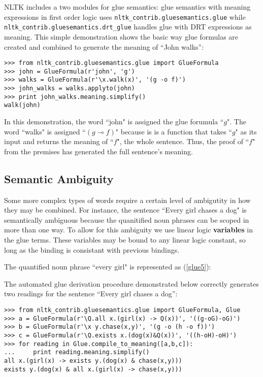 \documentclass{article}
\newcommand{\dhgcode}[1]{{\tt #1}}
\begin{document}

NLTK includes a two modules for glue semantics: glue semantics with meaning expressions in first order logic uses \dhgcode{nltk\_contrib.gluesemantics.glue} while \dhgcode{nltk\_contrib.gluesemantics.drt\_glue} handles glue with DRT expressions as meaning.  This simple demonstration shows the basic way glue formulas are created and combined to generate the meaning of ``John walks'':

\begin{verbatim}
>>> from nltk_contrib.gluesemantics.glue import GlueFormula
>>> john = GlueFormula(r'john', 'g')
>>> walks = GlueFormula(r'\x.walk(x)', '(g -o f)')
>>> john_walks = walks.applyto(john)
>>> print john_walks.meaning.simplify()
walk(john)
\end{verbatim}

In this demonstration, the word ``john" is assigned the glue forumula ``$g$".  The word ``walks" is assigned ``$(g \multimap f)$" because is is a function that takes ``$g$" as its input and returns the meaning of ``$f$", the whole sentence.  Thus, the proof of ``$f$" from the premises has generated the full sentence's meaning.

\subsection{Semantic Ambiguity}

Some more complex types of words require a certain level of ambigutity in how they may be combined.  For instance, the sentence ``Every girl chases a dog" is semantically ambiguous because the quanitified noun phrases can be scoped in more than one way.  To allow for this ambiguity we use linear logic \textbf{variables} in the glue terms.  These variables may be bound to any linear logic constant, so long as the binding is consistant with previous bindings.

The quantified noun phrase ``every girl" is represented as (\ref{glue5}):



The automated glue derivation procedure demonstrated below correctly generates two readings for the sentence ``Every girl chases a dog'':

\begin{verbatim}
>>> from nltk_contrib.gluesemantics.glue import GlueFormula, Glue
>>> a = GlueFormula(r'\Q.all x.(girl(x) -> Q(x))', '((g-oG)-oG)')
>>> b = GlueFormula(r'\x y.chase(x,y)', '(g -o (h -o f))')
>>> c = GlueFormula(r'\Q.exists x.(dog(x)&Q(x))', '((h-oH)-oH)')
>>> for reading in Glue.compile_to_meaning([a,b,c]):
...     print reading.meaning.simplify()
all x.(girl(x) -> exists y.(dog(x) & chase(x,y)))
exists y.(dog(x) & all x.(girl(x) -> chase(x,y)))
\end{verbatim}

{}
\end{document}
